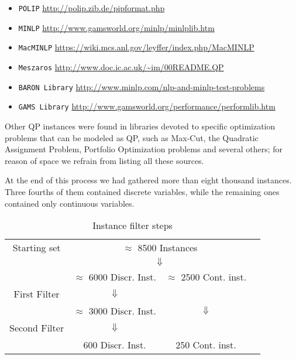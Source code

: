 \begin{itemize}
 \item {\tt POLIP} \url{http://polip.zib.de/pipformat.php}
 \item {\tt MINLP} \url{http://www.gamsworld.org/minlp/minlplib.htm}
 \item {\tt MacMINLP} \url{https://wiki.mcs.anl.gov/leyffer/index.php/MacMINLP}
 \item {\tt Meszaros} \url{http://www.doc.ic.ac.uk/~im/00README.QP}
 \item {\tt BARON Library} \url{http://www.minlp.com/nlp-and-minlp-test-problems}
 \item {\tt GAMS Library} \url{http://www.gamsworld.org/performance/performlib.htm}
\end{itemize}
%
Other QP instances were found in libraries devoted to specific optimization problems that can be modeled as QP, such as Max-Cut, the Quadratic Assignment Problem, Portfolio Optimization problems and several others; for reason of space we refrain from listing all these sources.  

At the end of this process we had gathered more than eight thousand instances. Three fourths of them contained discrete variables, while the remaining ones contained only continuous variables.  

\begin{center}
\begin{table}[]
 \centering

 \setlength{\tabcolsep}{5pt}
\begin{tabular}{cccc}
Starting set& \multicolumn{ 2}{c}{ $\approx$ 8500 Instances }& \\
& \multicolumn{ 2}{c}{$\Downarrow$}& \\
& $\approx$ 6000 Discr. Inst.  & $\approx$ 2500 Cont. inst. & \\
First Filter  & $\Downarrow$  &  & \\
 & $\approx$ 3000 Discr. Inst.  & $\Downarrow$ & \\
Second Filter & $\Downarrow$  &  & \\
 & 600 Discr. Inst.  & 250  Cont. inst. & \\
\end{tabular}  
\caption{Instance filter steps} \label{tab:filters}
\end{table}
\end{center}

